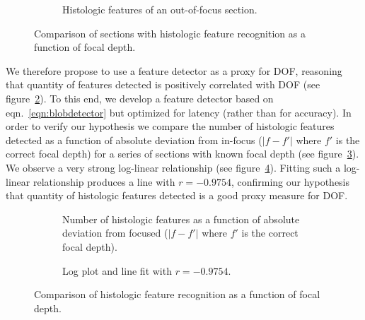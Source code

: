 \documentclass[sigconf,nonacm]{acmart}
\begin{document}
\begin{figure}
\begin{subfigure}[b]{0.5\textwidth}
         \caption{Histologic features of an out-of-focus section.}
         \label{subfig:outoffocus}
     \end{subfigure}
     \caption{Comparison of sections with histologic feature recognition as a function of focal depth.}
    \label{fig:histfeatsimages}
\end{figure}

We therefore propose to use a feature detector as a proxy for DOF, reasoning that quantity of features detected is positively correlated with DOF (see figure~\ref{fig:histfeatsimages}). 
To this end, we develop a feature detector based on eqn.~\ref{eqn:blobdetector} but optimized for latency (rather than for accuracy).
In order to verify our hypothesis we compare the number of histologic features detected as a function of absolute deviation from in-focus ($\lvert f - f' \rvert$ where $f'$ is the correct focal depth) for a series of sections with known focal depth (see figure~\ref{subfig:degreeoofcurve}). 
We observe a very strong log-linear relationship (see figure~\ref{subfig:degreeooffit}). 
Fitting such a log-linear relationship produces a line with $r=-0.9754$, confirming our hypothesis that quantity of histologic features detected is a good proxy measure for DOF.

\begin{figure}
     \centering
     \begin{subfigure}[b]{0.5\textwidth}
         \centering
         
         \caption{Number of histologic features as a function of absolute deviation from focused ($\lvert f - f' \rvert$ where $f'$ is the correct focal depth).}
         \label{subfig:degreeoofcurve}
     \end{subfigure}
     \par\bigskip
     \begin{subfigure}[b]{0.5\textwidth}
         \centering
        
         \caption{Log plot and line fit with $r = -0.9754$.}
         \label{subfig:degreeooffit}
     \end{subfigure}
     \caption{Comparison of histologic feature recognition as a function of focal depth.}
    \label{fig:histfeats}
\end{figure}
\end{document}

